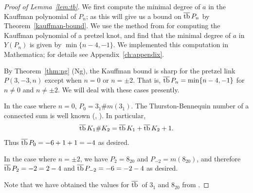 \begin{proof}[Proof of Lemma~\ref{lem:tb}]

    We first compute the minimal degree of $a$ in the Kauffman polynomial of $P_n$; as this will give us a bound on $\overline{\operatorname{tb}}\, P_n$ by Theorem~\ref{kauffman-bound}. We use the method from \cite{lu-zhong} for computing the Kauffman polynomial of a pretzel knot, and find that the minimal degree of $a$ in $Y(P_n)$ is given by $\min\{n-4, -1\}$. We implemented this computation in Mathematica; for details see Appendix~\ref{ch:appendix}.
    
    By Theorem~\ref{thm:ng} (Ng), the Kauffman bound is sharp for the pretzel link $P(3, -3, n)$ except when $n = 0$ or $n = \pm 2$. That is, $\overline{\operatorname{tb}}\, P_n = \min\{n-4, -1\}$ for $n \neq 0$ and $n \neq \pm 2$. We will deal with these cases presently.

    In the case where $n = 0$, $P_0 = 3_1 \# m(3_1)$. The Thurston-Bennequin number of a connected sum is well known (\cite{torisu}, \cite{honda}). In particular,
    \[
        \overline{\operatorname{tb}}\,{K_1 \# K_2} = \overline{\operatorname{tb}}\, K_1 + \overline{\operatorname{tb}}\, K_2 + 1.
    \]
    Thus $\overline{\operatorname{tb}}\, P_0 = -6 + 1 + 1 = -4$ as desired.

    In the case where $n = \pm 2$, we have $P_2 = 8_{20}$ and $P_{-2} = m(8_{20})$, and therefore $\overline{\operatorname{tb}}\, P_2 = -2 = 2-4$ and $\overline{\operatorname{tb}}\, P_{-2} = -6 = -2-4$ as desired.

    Note that we have obtained the values for $\overline{\operatorname{tb}}\,$ of $3_1$ and $8_{20}$ from \cite{atlas}.

\end{proof}


